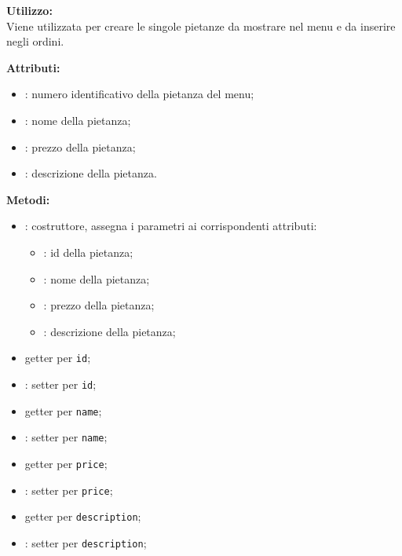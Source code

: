 \textbf{Utilizzo:}\\
Viene utilizzata per creare le singole pietanze da mostrare nel menu e da inserire negli ordini.

%

\textbf{Attributi:}
\begin{itemize}
	\item {}: numero identificativo della pietanza del menu;
	\item {}: nome della pietanza;
	\item {}: prezzo della pietanza;
	\item {}: descrizione della pietanza.
\end{itemize}

\textbf{Metodi:}
\begin{itemize}
	\item {}: costruttore, assegna i parametri ai corrispondenti attributi:
	\begin{itemize}
		\item {}: id della pietanza;
		\item {}: nome della pietanza;
		\item {}: prezzo della pietanza;
		\item {}: descrizione della pietanza;
	\end{itemize}
	\item {} getter per \texttt{id};
	\item {}: setter per \texttt{id};
	\item {} getter per \texttt{name};
	\item {}: setter per \texttt{name};
	\item {} getter per \texttt{price};
	\item {}: setter per \texttt{price};
	\item {} getter per \texttt{description};
	\item {}: setter per \texttt{description};
\end{itemize}

